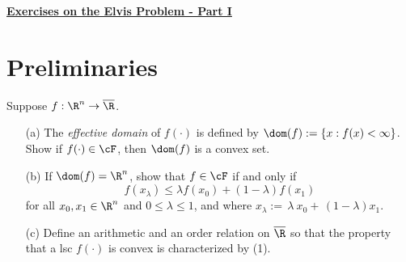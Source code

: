 \documentclass[12pt]{article}
\begin{document}

\begin{center}
{\LARGE\bf\underline{Exercises on the Elvis Problem - Part I}}
\end{center}

\section{Preliminaries}

{\blue
\begin{exer}
Suppose $f:\R^n\to\overline{\R}$.
\begin{itemize}
	\item[(a)]  The {\em effective domain} of $f(\cdot)$ is defined by $\dom(f):=\{x:f(x)<\infty\}$.  Show if $f(\cdot)\in\cF$, then $		\dom(f)$ is a convex set. 
	\item[(b)]  If $\dom(f)=\R^n$, show that $f\in\cF$ if and only if 
		\begin{equation}\label{eq: cnvx}
			f(x_{\lambda})\leq \lambda f(x_0)+(1-\lambda)f(x_1)
		\end{equation}
		for all $x_0,x_1\in\R^n$ and $0\leq \lambda\leq 1$, and where $x_{\lambda}:=\,\lambda\ x_0+\,    (1-\lambda)x_1$.
	\item[(c)]  Define an arithmetic and an order relation on $\overline{\R}$ so that the property that a lsc $f(\cdot)$ is convex is 		characterized by (1).
\end{itemize}
\end{exer}
}
\end{document}
